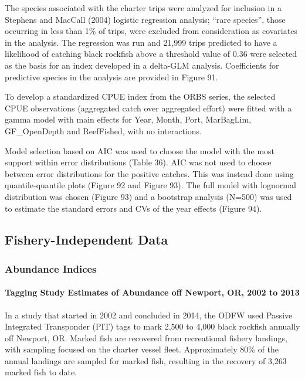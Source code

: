 \documentclass[11pt,
  english,
  letterpaper,
]{article}
\begin{document}
The species associated with the charter trips were analyzed for inclusion in a Stephens and MacCall (2004) logistic regression analysis; ``rare species'', those occurring in less than 1\% of trips, were excluded from consideration as covariates in the analysis. The regression was run and 21,999 trips predicted to have a likelihood of catching black rockfish above a threshold value of 0.36 were selected as the basis for an index developed in a delta-GLM analysis. Coefficients for predictive species in the analysis are provided in Figure 91.

To develop a standardized CPUE index from the ORBS series, the selected CPUE observations (aggregated catch over aggregated effort) were fitted with a gamma model with main effects for Year, Month, Port, MarBagLim, GF\_OpenDepth and ReefFished, with no interactions.

Model selection based on AIC was used to choose the model with the most support within error distributions (Table 36). AIC was not used to choose between error distributions for the positive catches. This was instead done using quantile-quantile plots (Figure 92 and Figure 93). The full model with lognormal distribution was chosen (Figure 93) and a bootstrap analysis (N=500) was used to estimate the standard errors and CVs of the year effects (Figure 94).

\hypertarget{fishery-independent-data}{%
\subsection{Fishery-Independent Data}\label{fishery-independent-data}}

\hypertarget{abundance-indices}{%
\subsubsection{Abundance Indices}\label{abundance-indices}}

\hypertarget{tagging-study-estimates-of-abundance-off-newport-or-2002-to-2013}{%
\paragraph{Tagging Study Estimates of Abundance off Newport, OR, 2002 to 2013}\label{tagging-study-estimates-of-abundance-off-newport-or-2002-to-2013}}

In a study that started in 2002 and concluded in 2014, the ODFW used Passive Integrated Transponder (PIT) tags to mark 2,500 to 4,000 black rockfish annually off Newport, OR. Marked fish are recovered from recreational fishery landings, with sampling focused on the charter vessel fleet. Approximately 80\% of the annual landings are sampled for marked fish, resulting in the recovery of 3,263 marked fish to date.
\end{document}
